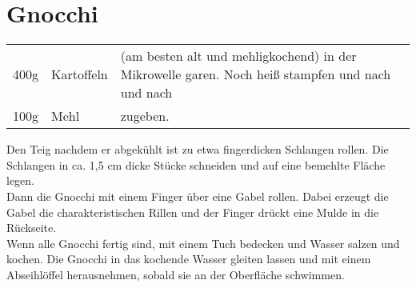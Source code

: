 \section{Gnocchi}
\begin{longtable}{rlL{18cm}}
	400g	&	Kartoffeln	&	(am besten alt und mehligkochend) in der Mikrowelle garen.
								Noch heiß stampfen und nach und nach	\\
	100g	&	Mehl		&	zugeben.	\\
\end{longtable}

Den Teig nachdem er abgekühlt ist zu etwa fingerdicken Schlangen rollen.
Die Schlangen in ca. 1,5 cm dicke Stücke schneiden und auf eine bemehlte Fläche legen.\\

Dann die Gnocchi mit einem Finger über eine Gabel rollen.
Dabei erzeugt die Gabel die charakteristischen Rillen und der Finger drückt eine Mulde in die Rückseite.\\

Wenn alle Gnocchi fertig sind, mit einem Tuch bedecken und Wasser salzen und kochen.
Die Gnocchi in das kochende Wasser gleiten lassen und mit einem Abseihlöffel herausnehmen, sobald sie an der Oberfläche schwimmen.